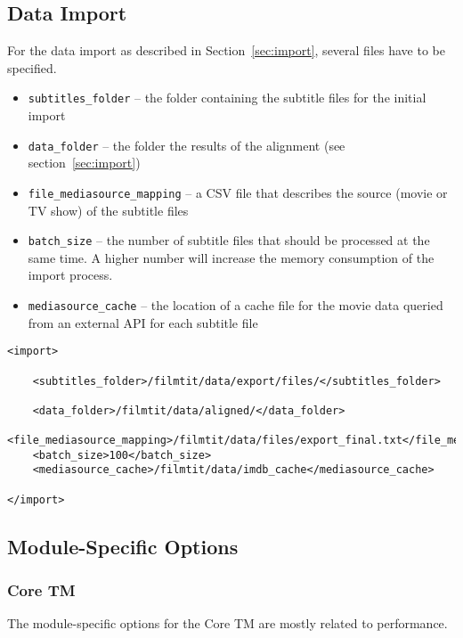 \subsection{Data Import}

For the data import as described in Section~\ref{sec:import}, several files have to be specified.

\begin{itemize}
        \item \verb#subtitles_folder# -- the folder containing the subtitle files for the initial import
        \item \verb#data_folder# -- the folder the results of the alignment (see section~\ref{sec:import})
        \item \verb#file_mediasource_mapping# -- a CSV file that describes the source (movie or TV show) of the  subtitle files
        \item \verb#batch_size# -- the number of subtitle files that should be processed at the same time. A higher number will increase the memory consumption of the import process.
        \item \verb#mediasource_cache# -- the location of a cache file for the movie data queried from an external API for each subtitle file
        
\end{itemize}


\begin{lstlisting}
<import>

    <subtitles_folder>/filmtit/data/export/files/</subtitles_folder>

    <data_folder>/filmtit/data/aligned/</data_folder>
    <file_mediasource_mapping>/filmtit/data/files/export_final.txt</file_mediasource_mapping>
    <batch_size>100</batch_size>
    <mediasource_cache>/filmtit/data/imdb_cache</mediasource_cache>

</import>
\end{lstlisting}


\subsection{Module-Specific Options}

\subsubsection{Core TM}

The module-specific options for the Core TM are mostly related to performance.


